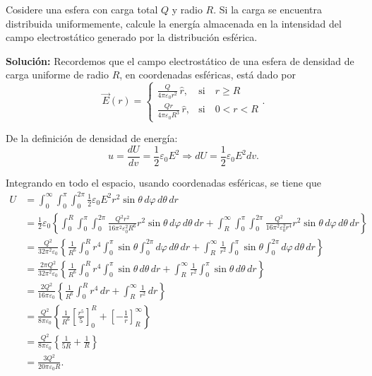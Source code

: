 \begin{ejemplo}
Cosidere una esfera con carga total $Q$ y radio $R$. Si la carga se encuentra distribuida uniformemente, calcule la energía almacenada en la intensidad del campo electrostático generado por la distribución esférica.

\textbf{Solución:} Recordemos que el campo electrostático de una esfera de densidad de carga uniforme de radio $R$, en coordenadas esféricas, está dado por
$$\Vec{E}(r) =  \left\{ \begin{array}{cl}
   \frac{Q}{4\pi \varepsilon_0 r^2} \,\hat{r}  ,  & \text{si} \quad r \geq R  \\
    \frac{Qr}{4\pi \varepsilon_0 R^3}\,\hat{r}, & \text{si} \quad  0 < r < R 
\end{array} \right. .$$

De la definición de densidad de energía:
$$u = \frac{d U}{dv} = \frac{1}{2} \varepsilon_0 E^2 \Rightarrow dU = \frac{1}{2} \varepsilon_0 E^2 dv.$$

Integrando en todo el espacio, usando coordenadas esféricas, se tiene que
\begin{align*}
U &= \int_0^{\infty} \int_0^{\pi} \int_0^{2\pi} \frac{1}{2} \varepsilon_0 E^2 r^2 \sin\theta \,d\varphi \,d\theta \,dr \\
&= \frac{1}{2} \varepsilon_0 \left\{ \int_0^R \int_0^{\pi} \int_0^{2\pi} \frac{Q^2r^2}{16\pi^2 \varepsilon_0^2 R^6} r^2 \sin\theta \,d\varphi\, d\theta \,dr + \int_R^{\infty} \int_0^{\pi} \int_0^{2\pi} \frac{Q^2}{16\pi^2 \varepsilon_0^2 r^4} r^2 \sin\theta \,d\varphi \,d\theta \,dr \right\} \\
&= \frac{Q^2 }{32\pi^2 \varepsilon_0} \left\{ \frac{1}{R^6}\int_0^R r^4 \int_0^{\pi} \sin\theta \int_0^{2\pi} d\varphi \,d\theta \,dr + \int_R^{ \infty} \frac{1}{r^2} \int_0^{\pi} \sin \theta \int_0^{2\pi} d\varphi \,d\theta \,dr \right\} \\
&= \frac{2\pi Q^2}{32 \pi^2 \varepsilon_0} \left\{ \frac{1}{R^6} \int_0^R r^4 \int_0^{\pi} \sin \theta \,d\theta \,dr + \int_R^{\infty} \frac{1}{r^2} \int_0^{\pi} \sin\theta \,d\theta\, dr\right\} \\
&= \frac{2Q^2}{16 \pi \varepsilon_0} \left\{ \frac{1}{R^6} \int_0^R r^4 \,dr + \int_R^{\infty} \frac{1}{r^2} \,dr \right\} \\
&= \frac{Q^2}{8 \pi \varepsilon_0} \left\{ \frac{1}{R^6} \left[ \frac{r^5}{5} \right]_0^R + \left[ - \frac{1}{r} \right]_R^{\infty} \right\} \\
&= \frac{Q^2}{8\pi \varepsilon_0} \left\{ \frac{1}{5R} + \frac{1}{R} \right\} \\
&= \frac{3Q^2}{20\pi \varepsilon_0 R}.
\end{align*}
\end{ejemplo}

